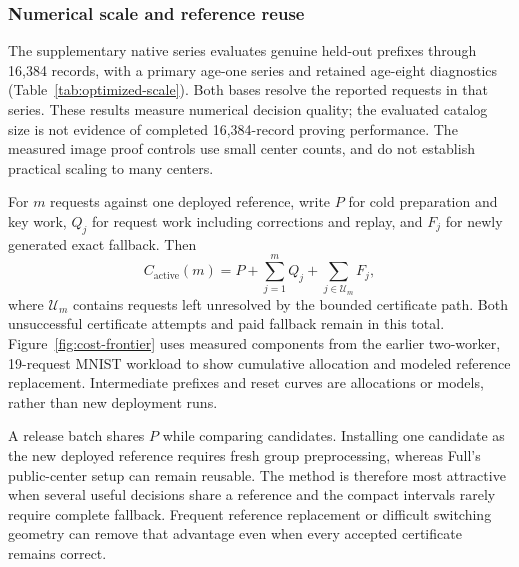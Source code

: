 \subsubsection{Numerical scale and reference reuse}
The supplementary native series evaluates genuine held-out prefixes through
16,384 records, with a primary age-one series and retained age-eight
diagnostics (Table~\ref{tab:optimized-scale}). Both bases resolve the
reported requests in that series. These results measure numerical decision
quality; the evaluated catalog size is not evidence of completed
16,384-record proving performance. The measured image proof controls use
small center counts, and do not establish practical scaling to many centers.

For $m$ requests against one deployed reference, write $P$ for cold
preparation and key work, $Q_j$ for request work including corrections and
replay, and $F_j$ for newly generated exact fallback. Then
\begin{equation}\label{eq:service-cost}
 C_{\mathrm{active}}(m)=P+\sum_{j=1}^{m}Q_j
                     +\sum_{j\in\mathcal U_m}F_j,
\end{equation}
where $\mathcal U_m$ contains requests left unresolved by the bounded
certificate path. Both unsuccessful certificate attempts and paid fallback
remain in this total. Figure~\ref{fig:cost-frontier} uses measured components
from the earlier two-worker, 19-request MNIST workload to show cumulative
allocation and modeled reference replacement. Intermediate prefixes and
reset curves are allocations or models, rather than new deployment runs.


A release batch shares $P$ while comparing candidates. Installing one
candidate as the new deployed reference requires fresh group preprocessing,
whereas Full's public-center setup can remain reusable. The method is
therefore most attractive when several useful decisions share a reference
and the compact intervals rarely require complete fallback. Frequent
reference replacement or difficult switching geometry can remove that
advantage even when every accepted certificate remains correct.
